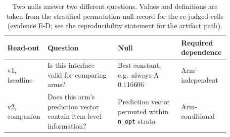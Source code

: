 \begin{table}[t]
\centering
\small
\setlength{\tabcolsep}{4pt}
\begin{tabular}{p{0.12\linewidth}p{0.31\linewidth}p{0.29\linewidth}p{0.17\linewidth}}
\toprule
Read-out & Question & Null & Required dependence \\
\midrule
v1, headline & Is this interface valid for comparing arms? & Best constant, e.g.\ always-A 0.116606 & Arm-independent \\
v2, companion & Does this arm's prediction vector contain item-level information? & Prediction vector permuted within \texttt{n\_opt} strata & Arm-conditional \\
\bottomrule
\end{tabular}
\caption{Two nulls answer two different questions. Values and definitions are taken from the stratified permutation-null record for the re-judged cells (evidence \textsf{E-D}; see the reproducibility statement for the artifact path).}
\label{tab:two-nulls}
\end{table}

